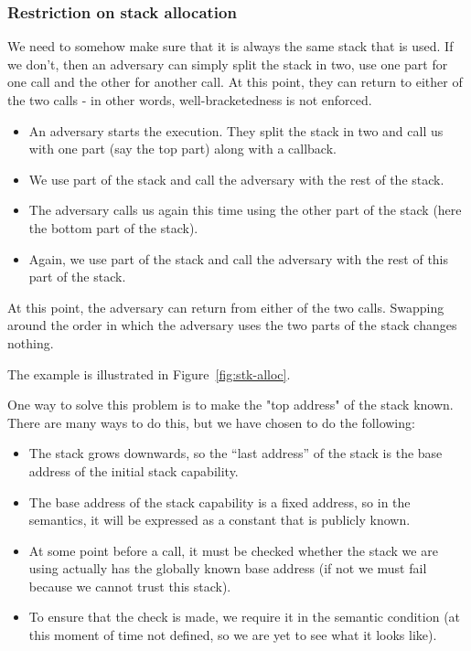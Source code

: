 \documentclass[a3paper]{article}
\begin{document}
\subsubsection{Restriction on stack allocation}
We need to somehow make sure that it is always the same stack that is used. If we don't, then an adversary can simply split the stack in two, use one part for one call and the other for another call. At this point, they can return to either of the two calls - in other words, well-bracketedness is not enforced.

\begin{itemize}
  \item An adversary starts the execution. They split the stack in two and call us with one part (say the top part) along with a callback.
  \item We use part of the stack and call the adversary with the rest of the stack.
  \item The adversary calls us again this time using the other part of the stack (here the bottom part of the stack).
  \item Again, we use part of the stack and call the adversary with the rest of this part of the stack.
\end{itemize}
At this point, the adversary can return from either of the two calls. Swapping around the order in which the adversary uses the two parts of the stack changes nothing.

The example is illustrated in Figure~\ref{fig:stk-alloc}.

One way to solve this problem is to make the "top address" of the stack known. There are many ways to do this, but we have chosen to do the following:
\begin{itemize}
\item The stack grows downwards, so the ``last address'' of the stack is the base address of the initial stack capability.
\item The base address of the stack capability is a fixed address, so in the semantics, it will be expressed as a constant that is publicly known.
\item At some point before a call, it must be checked whether the stack we are using actually has the globally known base address (if not we must fail because we cannot trust this stack).
\item To ensure that the check is made, we require it in the semantic condition (at this moment of time not defined, so we are yet to see what it looks like).
\end{itemize}
\end{document}
